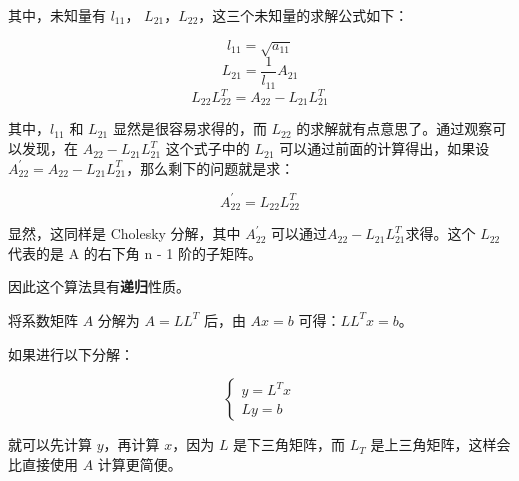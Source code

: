 其中，未知量有 \(l_{11}\)，
\(L_{21}\)，\(L_{22}\)，这三个未知量的求解公式如下：

\[ l_{11} = \sqrt{a_{11}} \]
\[ L_{21} = \frac{1}{l_{11}}A_{21} \]
\[ L_{22}L_{22}^T = A_{22} - L_{21}L_{21}^T \]

其中，\(l_{11}\) 和 \(L_{21}\) 显然是很容易求得的，而 \(L_{22}\)
的求解就有点意思了。通过观察可以发现，在 \(A_{22} - L_{21}L_{21}^T\)
这个式子中的 \(L_{21}\) 可以通过前面的计算得出，如果设
\(A_{22}^{'} = A_{22} - L_{21}L_{21}^T\)，那么剩下的问题就是求：

\[ A_{22}^{'} = L_{22}L_{22}^T \]

显然，这同样是 Cholesky 分解，其中 \(A_{22}^{'}\)
可以通过\(A_{22} - L_{21}L_{21}^T\)求得。这个 \(L_{22}\) 代表的是 A
的右下角 n - 1 阶的子矩阵。

因此这个算法具有\textbf{递归}性质。

将系数矩阵 \(A\) 分解为 \(A = L L^T\) 后，由 \(Ax = b\)
可得：\(LL^Tx = b\)。

如果进行以下分解：


\[
    \left\{\begin{matrix}
        y = L^Tx \\
        Ly = b
    \end{matrix}\right.
\]


就可以先计算 \(y\)，再计算 \(x\)，因为 \(L\) 是下三角矩阵，而 \(L_T\)
是上三角矩阵，这样会比直接使用 \(A\) 计算更简便。

\subsubsection{}
